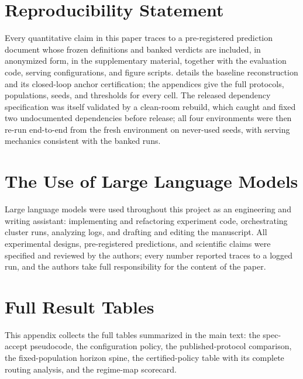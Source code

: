 \documentclass{article}
\begin{document}
\section*{Reproducibility Statement}
Every quantitative claim in this paper traces to a pre-registered prediction
document whose frozen definitions and banked verdicts are included, in
anonymized form, in the supplementary material, together with the evaluation
code, serving configurations, and figure scripts.  details
the baseline reconstruction and its closed-loop anchor certification; the
appendices give the full protocols, populations, seeds, and thresholds for
every cell. The released dependency specification was itself validated by a
clean-room rebuild, which caught and fixed two undocumented dependencies
before release; all four environments were then re-run end-to-end from the
fresh environment on never-used seeds, with serving mechanics consistent
with the banked runs.

\section*{The Use of Large Language Models}
Large language models were used throughout this project as an engineering
and writing assistant: implementing and refactoring experiment code,
orchestrating cluster runs, analyzing logs, and drafting and editing the
manuscript. All experimental designs, pre-registered predictions, and
scientific claims were specified and reviewed by the authors; every number
reported traces to a logged run, and the authors take full responsibility
for the content of the paper.




\appendix\label{appendixstart}

\section{Full Result Tables}
\label{app:fulltables}
This appendix collects the full tables summarized in the main text: the
spec-accept pseudocode, the configuration policy, the published-protocol
comparison, the fixed-population horizon spine, the certified-policy table with
its complete routing analysis, and the regime-map scorecard.
\end{document}
